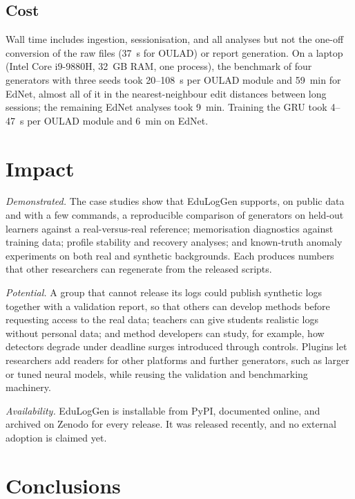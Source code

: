 \documentclass[preprint,12pt]{elsarticle}
\begin{document}
\subsection{Cost}
Wall time includes ingestion, sessionisation, and all analyses but not the
one-off conversion of the raw files (37~s for OULAD) or report generation.
On a laptop (Intel Core i9-9880H, 32~GB RAM, one process), the benchmark of
four generators with three seeds took 20--108~s per OULAD module and 59~min
for EdNet, almost all of it in the nearest-neighbour edit distances between
long sessions; the remaining EdNet analyses took 9~min. Training the GRU took
4--47~s per OULAD module and 6~min on EdNet.

\section{Impact}

\emph{Demonstrated.} The case studies show that EduLogGen supports, on public
data and with a few commands, a reproducible comparison of generators on
held-out learners against a real-versus-real reference; memorisation
diagnostics against training data; profile stability and recovery analyses;
and known-truth anomaly experiments on both real and synthetic backgrounds.
Each produces numbers that other researchers can regenerate from the
released scripts.

\emph{Potential.} A group that cannot release its logs could publish
synthetic logs together with a validation report, so that others can develop
methods before requesting access to the real data; teachers can give students
realistic logs without personal data; and method developers can study, for
example, how detectors degrade under deadline surges introduced through
controls. Plugins let researchers add readers for other platforms and further
generators, such as larger or tuned neural models, while reusing the
validation and benchmarking machinery.

\emph{Availability.} EduLogGen is installable from PyPI, documented online,
and archived on Zenodo for every release. It was released recently, and no
external adoption is claimed yet.

\section{Conclusions}
\end{document}
